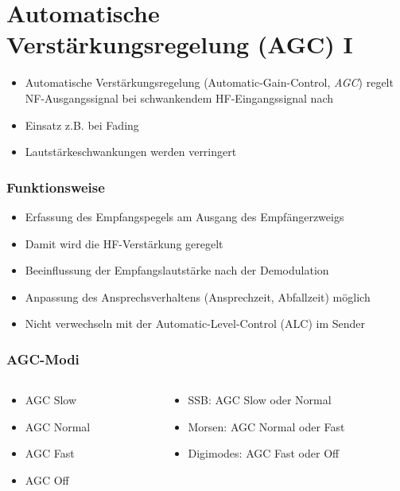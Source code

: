 
\section{Automatische Verstärkungsregelung (AGC) I}
\label{section:agc_1}
\begin{frame}%
\begin{itemize}
  \item Automatische Verstärkungsregelung (Automatic-Gain-Control, \emph{AGC}) regelt NF-Ausgangssignal bei schwankendem HF-Eingangssignal nach
  \item Einsatz z.B. bei Fading
  \item Lautstärkeschwankungen werden verringert
  \end{itemize}
\end{frame}

\begin{frame}
\frametitle{Funktionsweise}
\begin{itemize}
  \item Erfassung des Empfangspegels am Ausgang des Empfängerzweigs
  \item Damit wird die HF-Verstärkung geregelt
  \item Beeinflussung der Empfangslautstärke nach der Demodulation
  \item Anpassung des Ansprechsverhaltens (Ansprechzeit, Abfallzeit) möglich
  \end{itemize}
\begin{itemize}
  \item Nicht verwechseln mit der Automatic-Level-Control (ALC) im Sender
  \end{itemize}
\end{frame}

\begin{frame}
\frametitle{AGC-Modi}
\begin{columns}
    \begin{column}{0.48\textwidth}
    \begin{itemize}
  \item AGC Slow
  \item AGC Normal
  \item AGC Fast
  \item AGC Off
  \end{itemize}

    \end{column}
   \begin{column}{0.48\textwidth}
       \begin{itemize}
  \item SSB: AGC Slow oder Normal
  \item Morsen: AGC Normal oder Fast
  \item Digimodes: AGC Fast oder Off
  \end{itemize}

   \end{column}
\end{columns}

\end{frame}

